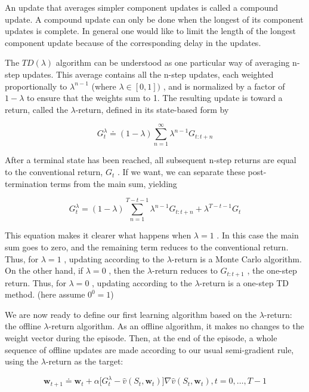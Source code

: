 \documentclass{article}
\begin{document}
An update that averages simpler component updates is called a compound update. A compound update can only be done when the longest of its component updates is complete. In general one would like to limit the length of the longest component update because of the corresponding delay in the updates.

The $TD(\lambda)$ algorithm can be understood as one particular way of averaging n-step updates. This average contains all the n-step updates, each weighted proportionally to $\lambda ^ { n - 1 }$ (where $\lambda \in [0,1])$ , and is normalized by a factor of $1 - \lambda$ to ensure that the weights sum to 1. The resulting update is toward a return, called the $\lambda$-return, defined in its state-based form by

$$
G _ { t } ^ { \lambda } \doteq ( 1 - \lambda ) \sum _ { n = 1 } ^ { \infty } \lambda ^ { n - 1 } G _ { t : t + n }
$$

After a terminal state has been reached, all subsequent n-step returns are equal to the conventional return, $G _ { t }$ . If we want, we can separate these post-termination terms from the main sum, yielding

$$
G _ { t } ^ { \lambda } = ( 1 - \lambda ) \sum _ { n = 1 } ^ { T - t - 1 } \lambda ^ { n - 1 } G _ { t : t + n } + \lambda ^ { T - t - 1 } G _ { t }
$$

This equation makes it clearer what happens when $\lambda = 1$ . In this case the main sum goes to zero, and the remaining term reduces to the conventional return. Thus, for $\lambda = 1$ , updating according to the $\lambda$-return is a Monte Carlo algorithm. On the other hand, if $\lambda = 0$ , then the $\lambda$-return reduces to $G _ { t : t + 1 }$ , the one-step return. Thus, for $\lambda = 0$ , 
updating according to the $\lambda$-return is a one-step TD method. (here assume $0 ^ {0} = 1$)

We are now ready to define our first learning algorithm based on the $\lambda$-return: the offline $\lambda$-return algorithm. As an offline algorithm, it makes no changes to the weight vector during the episode. Then, at the end of the episode, a whole sequence of offline updates are made according to our usual semi-gradient rule, using the $\lambda$-return as the target:

$$
\mathbf { w } _ { t + 1 } \doteq \mathbf { w } _ { t } + \alpha \Big [ G _ { t } ^ { \lambda } - \hat { v } ( S _ { t } { , } \mathbf { w } _ { t } ) \Big ] \nabla \hat { v } ( S _ { t } { , } \mathbf { w } _ { t } ) , t = 0 , \ldots , T - 1
$$
\end{document}
